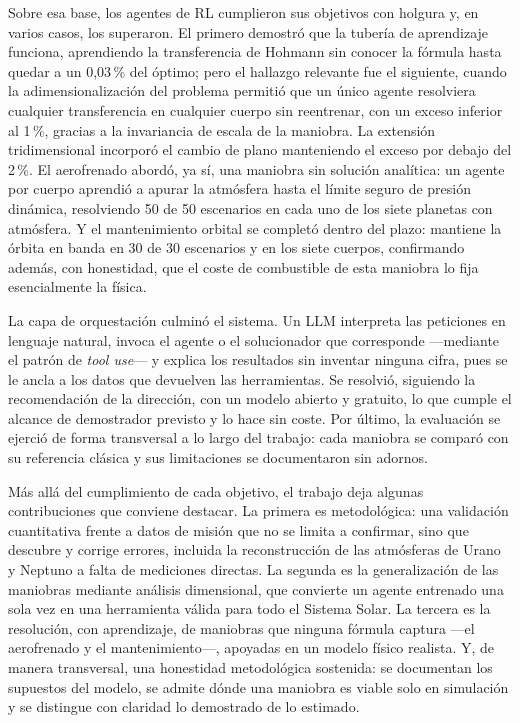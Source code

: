 Sobre esa base, los agentes de \gls{RL} cumplieron sus objetivos con holgura y, en varios casos, los superaron. El primero demostró que la tubería de aprendizaje funciona, aprendiendo la transferencia de Hohmann sin conocer la fórmula hasta quedar a un 0,03\,\% del óptimo; pero el hallazgo relevante fue el siguiente, cuando la adimensionalización del problema permitió que un único agente resolviera cualquier transferencia en cualquier cuerpo sin reentrenar, con un exceso inferior al 1\,\%, gracias a la invariancia de escala de la maniobra. La extensión tridimensional incorporó el cambio de plano manteniendo el exceso por debajo del 2\,\%. El aerofrenado abordó, ya sí, una maniobra sin solución analítica: un agente por cuerpo aprendió a apurar la atmósfera hasta el límite seguro de presión dinámica, resolviendo 50 de 50 escenarios en cada uno de los siete planetas con atmósfera. Y el mantenimiento orbital se completó dentro del plazo: mantiene la órbita en banda en 30 de 30 escenarios y en los siete cuerpos, confirmando además, con honestidad, que el coste de combustible de esta maniobra lo fija esencialmente la física.

La capa de orquestación culminó el sistema. Un \gls{LLM} interpreta las peticiones en lenguaje natural, invoca el agente o el solucionador que corresponde ---mediante el patrón de \textit{tool use}--- y explica los resultados sin inventar ninguna cifra, pues se le ancla a los datos que devuelven las herramientas. Se resolvió, siguiendo la recomendación de la dirección, con un modelo abierto y gratuito, lo que cumple el alcance de demostrador previsto y lo hace sin coste. Por último, la evaluación se ejerció de forma transversal a lo largo del trabajo: cada maniobra se comparó con su referencia clásica y sus limitaciones se documentaron sin adornos.


Más allá del cumplimiento de cada objetivo, el trabajo deja algunas contribuciones que conviene destacar. La primera es metodológica: una validación cuantitativa frente a datos de misión que no se limita a confirmar, sino que descubre y corrige errores, incluida la reconstrucción de las atmósferas de Urano y Neptuno a falta de mediciones directas. La segunda es la generalización de las maniobras mediante análisis dimensional, que convierte un agente entrenado una sola vez en una herramienta válida para todo el Sistema Solar. La tercera es la resolución, con aprendizaje, de maniobras que ninguna fórmula captura ---el aerofrenado y el mantenimiento---, apoyadas en un modelo físico realista. Y, de manera transversal, una honestidad metodológica sostenida: se documentan los supuestos del modelo, se admite dónde una maniobra es viable solo en simulación y se distingue con claridad lo demostrado de lo estimado.

